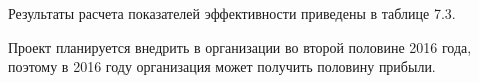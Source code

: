 Результаты расчета показателей эффективности приведены в таблице 7.3.

Проект планируется внедрить в организации во второй половине 2016 года, поэтому в 2016 году организация может получить половину прибыли.









